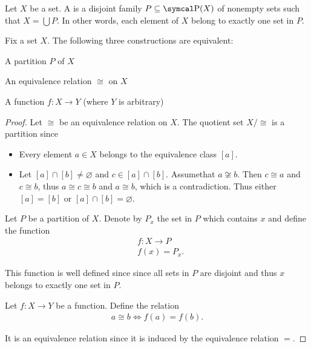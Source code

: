 \begin{definition}\label{def:set_partition}
  Let $X$ be a set. A  is a disjoint family $P \subseteq \Power(X)$ of nonempty sets such that $X = \bigcup P$. In other words, each element of $X$ belong to exactly one set in $P$.
\end{definition}

\begin{proposition}\label{thm:equivalence_partition}
  Fix a set $X$. The following three constructions are equivalent:
  \begin{defenum}
    \item\label{thm:equivalence_partition/partition} A partition $P$ of $X$
    \item\label{thm:equivalence_partition/equivalence} An equivalence relation $\cong$ on $X$
    \item\label{thm:equivalence_partition/function} A function $f: X \to Y$ (where $Y$ is arbitrary)
  \end{defenum}
\end{proposition}
\begin{proof}
   Let $\cong$ be an equivalence relation on $X$. The quotient set $X / \cong$ is a partition since
  \begin{itemize}
    \item Every element $a \in X$ belongs to the equivalence class $[a]$.
    \item Let $[a] \cap [b] \neq \varnothing$ and $c \in [a] \cap [b]$. Assume\LEM that $a \not\cong b$. Then $c \cong a$ and $c \cong b$, thus $a \cong c \cong b$ and $a \cong b$, which is a contradiction. Thus either $[a] = [b]$ or $[a] \cap [b] = \varnothing$.
  \end{itemize}

   Let $P$ be a partition of $X$. Denote by $P_x$ the set in $P$ which contains $x$ and define the function
  \begin{align*}
    &f: X \to P \\
    &f(x) = P_x.
  \end{align*}

  This function is well defined since since all sets in $P$ are disjoint and thus $x$ belongs to exactly one set in $P$.

   Let $f: X \to Y$ be a function. Define the relation
  \begin{align*}
    a \cong b \iff f(a) = f(b).
  \end{align*}

  It is an equivalence relation since it is induced by the equivalence relation $=$.
\end{proof}


